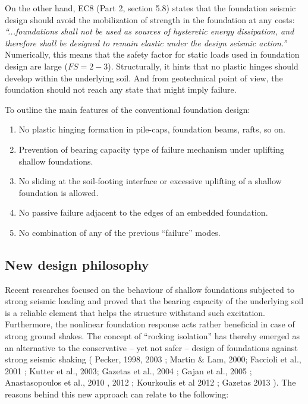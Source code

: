 \documentclass[12pt,a4paper]{report}
\begin{document}
On the other hand, EC8 (Part 2, section 5.8) \cite{code2005eurocode} states that the foundation seismic design should avoid the mobilization of strength in the foundation at any costs: \textit{“...foundations shall not be used as sources of hysteretic energy dissipation, and therefore shall be designed to remain elastic under the design seismic action.”} Numerically, this means that the safety factor for static loads used in foundation design are large ($FS=2-3$). Structurally, it hints that no plastic hinges should develop within the underlying soil. And from geotechnical point of view, the foundation should not reach any state that might imply failure. 

To outline the main features of the conventional foundation design:
\begin{enumerate}
	\item  No plastic hinging formation in pile-caps, foundation beams, rafts, so on.
	\item Prevention of bearing capacity type of failure mechanism under uplifting shallow foundations.
	\item No sliding at the soil-footing interface or excessive uplifting of a shallow foundation is allowed.
	\item No passive failure adjacent to the edges of an embedded foundation.
	\item No combination of any of the previous “failure” modes.
\end{enumerate}

\subsection{New design philosophy}
Recent researches focused on the behaviour of shallow foundations subjected to strong seismic loading and proved that the bearing capacity of the underlying soil is a reliable element that helps the structure withstand such excitation. Furthermore, the nonlinear foundation response acts rather beneficial in case of strong ground shakes. The concept of “rocking isolation” has thereby emerged as an alternative to the conservative – yet not safer – design of foundations against strong seismic shaking ( Pecker, 1998, 2003 \cite{pecker2014role}; Martin \& Lam, 2000; Faccioli et al., 2001 \cite{faccioli2001investigation}; Kutter et al., 2003; Gazetas et al., 2004 \cite{gazetas2004seismic}; Gajan et al., 2005 \cite{gajan2005centrifuge}; Anastasopoulos et al., 2010 \cite{anastasopoulos2010soil}, 2012 \cite{anastasopoulos2011simplified}; Kourkoulis et al 2012 \cite{kourkoulis2012rocking}; Gazetas 2013 \cite{gazetas2013nonlinear}). The reasons behind this new approach can relate to the following:
\end{document}
